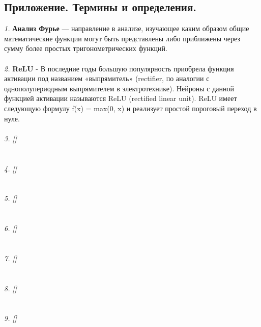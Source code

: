 \documentclass{article}
\begin{document}
    \newpage
    \begin{center} 
    \section{Приложение. Термины и определения.}
    \end{center} 
    \large 
    \textit{1.}
    \textbf{Анализ Фурье} — направление в анализе, изучающее каким образом общие математические функции могут быть представлены либо приближены через сумму более простых тригонометрических функций. 
    \\ \\
    \textit{2.}
    \textbf{ReLU} - В последние годы большую популярность приобрела функция активации под названием «выпрямитель» (rectifier, по аналогии с однополупериодным выпрямителем в электротехнике). Нейроны с данной функцией активации называются ReLU (rectified linear unit). ReLU имеет следующую формулу f(x) = max(0, x) и реализует простой пороговый переход в нуле.
    \\ \\
    \textit{3.  []}
    \\
    \\ \\
    \textit{4.  []}
    \\
    \\ \\
    \textit{5.  []}
    \\
    \\ \\
    \textit{6. []}
    \\
    \\ \\
    \textit{7. []}
    \\
    \\ \\
    \textit{8.  []}
    \\
    \\ \\
    \textit{9. []}
    \\
    \\ \\
    
\end{document}
